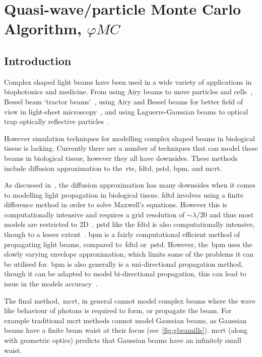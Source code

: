 \chapter{Quasi-wave/particle Monte Carlo Algorithm, \texorpdfstring{$\varphi MC$}{phiMC}}\label{sec:phase}

\section{Introduction}\label{sec:besintro}

Complex shaped light beams have been used in a wide variety of applications in biophotonics and medicine.
From using Airy beams to move particles and cells~\cite{baumgartl2008optically}, Bessel beam `tractor beams'~\cite{ruffner2012optical}, using Airy and Bessel beams for better field of view in light-sheet microscopy~\cite{vettenburg2014light}, and using Laguerre-Gaussian beams to optical trap optically reflective particles~\cite{simpson1996optical}.


However simulation techniques for modelling complex shaped beams in biological tissue is lacking.
Currently there are a number of techniques that can model these beams in biological tissue, however they all have downsides.
These methods include diffusion approximation to the~\gls*{rte}, \gls*{fdtd}, \gls*{pstd}, \gls*{bpm}, and \gls*{mcrt}.

As discussed in~, the diffusion approximation has many downsides when it comes to modelling light propagation in biological tissue.
\gls*{fdtd} involves using a finite difference method in order to solve Maxwell's equations.
However this is computationally intensive and requires a grid resolution of $\sim \lambda/20$ and thus most models are restricted to 2D~\cite{glaser2016fractal,elmaklizi2015penetration}. 
\gls*{pstd} like the \gls*{fdtd} is also computationally intensive, though to a lesser extent~\cite{glaser2016fractal}.
\gls*{bpm} is a fairly computational efficient method of propagating light beams, compared to~\gls*{fdtd} or~\gls*{pstd}.
However, the~\gls*{bpm} uses the slowly varying envelope approximation, which limits some of the problems it can be utilised for.
\Gls*{bpm} is also generally is a uni-directional propagation method, though it can be adapted to model bi-directional propagation, this can lead to issue in the models accuracy~\cite{van1981beam,glaser2016fractal}.

\medskip

The final method,~\gls*{mcrt}, in general cannot model complex beams where the wave like behaviour of photons is required to form, or propagate the beam.
For example traditional \gls*{mcrt} methods cannot model Gaussian beams, as Gaussian beams have a finite beam waist at their focus (see~\cref{fig:gbeamills}).
\Gls*{mcrt} (along with geometric optics) predicts that Gaussian beams have an infinitely small waist.

